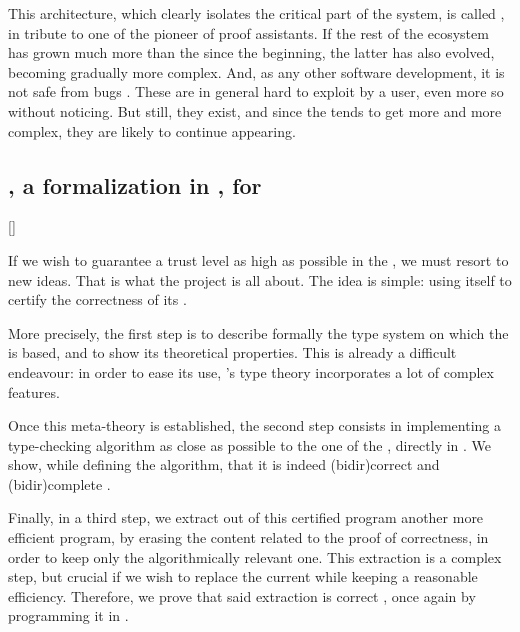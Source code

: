 This architecture, which clearly isolates the critical part of the system, is called
 , in tribute to one of the pioneer
of proof assistants.
If the rest of the ecosystem has grown much more than the  since the beginning,
the latter has also evolved, becoming gradually more complex.
And, as any other software development, it is not safe from bugs%
.
These are in general hard to exploit by a user, even more so without noticing.
But still, they exist, and since the  tends to get more and more complex, they
are likely to continue appearing.

\subsection{, a formalization in , for }[]

If we wish to guarantee a trust level as high as possible in the , we must
resort to new ideas. That is what the  project is all about. The idea
is simple: using  itself to certify the correctness of its .

More precisely, the first step is to describe formally the type system on which the 
is based, and to show its theoretical properties.
This is already a difficult endeavour: in order to ease its use, ’s type theory
incorporates a lot of complex features.

Once this meta-theory is established, the second step
consists in implementing a type-checking algorithm as close as possible to the one of the
, directly in %
.
We show, while defining the algorithm, that it is indeed \reintro(bidir){correct}%
and \reintro(bidir){complete}%
.

Finally, in a third step, we extract out of this certified  program another
more efficient program, by erasing the content related to the proof of correctness, in order
to keep only the algorithmically relevant one.
This extraction is a complex step, but crucial if we wish to replace the current 
while keeping a reasonable efficiency. Therefore, we prove that said extraction
is correct%
,
once again by programming it in .

